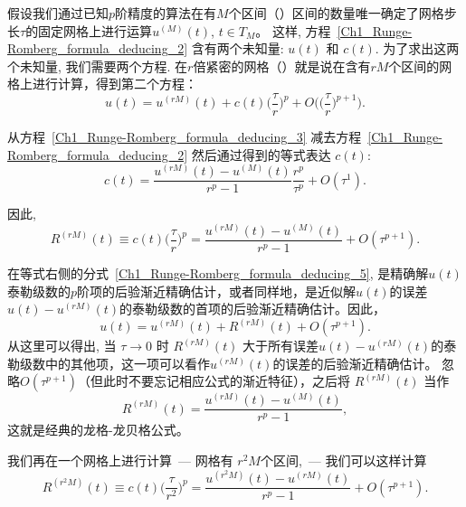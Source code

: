 \documentclass[twoside]{book}
\begin{document}
\begin{CJK*}{GBK}{song}
假设我们通过已知$p$阶精度的算法在有$M$个区间（）区间的数量唯一确定了网格步长$\tau$的固定网格上进行运算$u^{(M)}(t)$, $t \in T_M$。  这样, 方程~\eqref{Ch1_Runge-Romberg_formula_deducing_2} 含有两个未知量: $u(t)$ 和 $c(t)$. 为了求出这两个未知量, 我们需要两个方程. 在$r$倍紧密的网格（）就是说在含有$rM$个区间的网格上进行计算，得到第二个方程：
\begin{equation}
    \label{Ch1_Runge-Romberg_formula_deducing_3}
    u(t) = u^{(rM)}(t) + c(t) \Big(\frac{\tau}{r}\Big)^p + O\bigg(\Big(\frac{\tau}{r}\Big)^{p + 1}\bigg).
\end{equation}

从方程~\eqref{Ch1_Runge-Romberg_formula_deducing_3} 减去方程~\eqref{Ch1_Runge-Romberg_formula_deducing_2} 然后通过得到的等式表达 $c(t)$:
\begin{equation*}
    \label{Ch1_Runge-Romberg_formula_deducing_4}
    c(t) = \frac{u^{(rM)}(t) - u^{(M)}(t)}{r^p - 1}\frac{r^p}{\tau^p} + O(\tau^1).
\end{equation*}

因此,
\begin{equation}
    \label{Ch1_Runge-Romberg_formula_deducing_5}
    R^{(rM)}(t) \equiv c(t) \Big(\frac{\tau}{r}\Big)^p = \frac{u^{(rM)}(t) - u^{(M)}(t)}{r^p - 1} + O(\tau^{p + 1}).
\end{equation}

在等式右侧的分式~\eqref{Ch1_Runge-Romberg_formula_deducing_5}, 是精确解$u(t)$泰勒级数的$p$阶项的后验渐近精确估计，或者同样地，是近似解$u(t)$的误差$u(t) - u^{(rM)}(t)$的泰勒级数的首项的后验渐近精确估计。因此，
\begin{equation*}
    \label{Ch1_Runge-Romberg_formula_deducing_6}
    u(t) = u^{(rM)}(t) + R^{(rM)}(t) + O(\tau^{p + 1}).
\end{equation*}
从这里可以得出, 当 $\tau \to 0$ 时 $R^{(rM)}(t)$ 大于所有误差$u(t) - u^{(rM)}(t)$的泰勒级数中的其他项，这一项可以看作$u^{(rM)}(t)$的误差的后验渐近精确估计。 忽略$O(\tau^{p + 1})$（但此时不要忘记相应公式的渐近特征），之后将 $R^{(rM)}(t)$ 当作
\begin{equation}
    \label{Ch1_Runge-Romberg_formula_deducing_7}
    R^{(rM)}(t)  = \frac{u^{(rM)}(t) - u^{(M)}(t)}{r^p - 1},
\end{equation}
这就是经典的龙格-龙贝格公式。

我们再在一个网格上进行计算~--- 网格有 $r^2M$个区间,~--- 我们可以这样计算
\begin{equation*}
    \label{Ch1_Runge-Romberg_formula_deducing_8}
    R^{(r^2M)}(t) \equiv c(t) \Big(\frac{\tau}{r^2}\Big)^p = \frac{u^{(r^2M)}(t) - u^{(rM)}(t)}{r^p - 1} + O(\tau^{p + 1}).
\end{equation*}


\end{CJK*}
\end{document}
